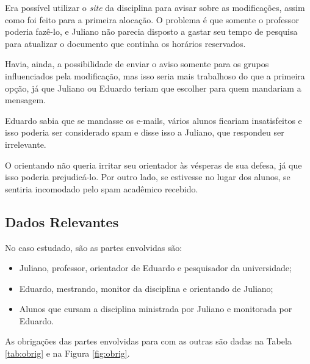 \documentclass[a4paper,dvipdfm]{article}
\begin{document}
	Era possível utilizar o \emph{site} da disciplina para avisar sobre as modificações, assim como foi feito para a primeira alocação. 
	O problema é que somente o professor poderia fazê-lo, e Juliano não parecia disposto a gastar seu tempo de pesquisa para atualizar o documento que continha os horários reservados.

	Havia, ainda, a possibilidade de enviar o aviso somente para os grupos influenciados pela modificação, mas isso seria mais trabalhoso do que a primeira opção, já que Juliano ou Eduardo teriam que escolher para quem mandariam a mensagem.
	
	Eduardo sabia que se mandasse os e-mails, vários alunos ficariam insatisfeitos e isso poderia ser considerado spam e disse isso a Juliano, que respondeu ser irrelevante.

	O orientando não queria irritar seu orientador às vésperas de sua defesa, já que isso poderia prejudicá-lo. 
	Por outro lado, se estivesse no lugar dos alunos, se sentiria incomodado pelo spam acadêmico recebido.

\newpage
	\subsection{Dados Relevantes}
		No caso estudado, são as partes envolvidas são:
		\begin{itemize}
			\item Juliano, professor, orientador de Eduardo e pesquisador da universidade;
			\item Eduardo, mestrando, monitor da disciplina e orientando de Juliano;
			\item Alunos que cursam a disciplina ministrada por Juliano e monitorada por Eduardo. 
		\end{itemize}

		As obrigações das partes envolvidas para com as outras são dadas na Tabela \ref{tab:obrig} e na Figura \ref{fig:obrig}.
\end{document}
